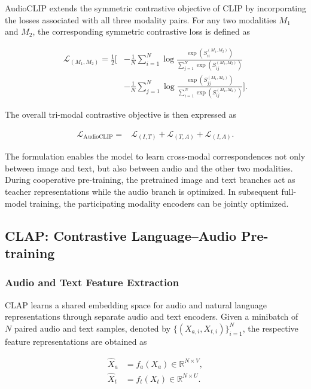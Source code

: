 \documentclass[pdflatex,sn-mathphys-num]{sn-jnl}%
\theoremstyle{thmstyleone}%
\theoremstyle{thmstyletwo}%
\theoremstyle{thmstylethree}%
\begin{document}
AudioCLIP extends the symmetric contrastive objective of CLIP by incorporating the losses associated with all three modality pairs. For any two modalities $M_1$ and $M_2$, the corresponding symmetric contrastive loss is defined as

\begin{align}
\mathcal{L}_{(M_1,M_2)}
=
\frac{1}{2}
\Bigg[
&-\frac{1}{N}
\sum_{i=1}^{N}
\log
\frac{\exp(S_{ii}^{(M_1,M_2)})}
{\sum_{j=1}^{N}\exp(S_{ij}^{(M_1,M_2)})}
\nonumber\\
&-\frac{1}{N}
\sum_{j=1}^{N}
\log
\frac{\exp(S_{jj}^{(M_1,M_2)})}
{\sum_{i=1}^{N}\exp(S_{ij}^{(M_1,M_2)})}
\Bigg].
\label{eq:audioclip_pair_loss}
\end{align}

The overall tri-modal contrastive objective is then expressed as

\begin{equation}
\begin{aligned}
\mathcal{L}_{\mathrm{AudioCLIP}}
={}&
\mathcal{L}_{(I,T)}
+
\mathcal{L}_{(T,A)}
+
\mathcal{L}_{(I,A)}.
\end{aligned}
\label{eq:audioclip_total}
\end{equation}

The formulation enables the model to learn cross-modal correspondences not only between image and text, but also between audio and the other two modalities. During cooperative pre-training, the pretrained image and text branches act as teacher representations while the audio branch is optimized. In subsequent full-model training, the participating modality encoders can be jointly optimized.

\subsection{CLAP: Contrastive Language--Audio Pre-training}

\subsubsection{Audio and Text Feature Extraction}

CLAP learns a shared embedding space for audio and natural language representations through separate audio and text encoders. Given a minibatch of $N$ paired audio and text samples, denoted by $\{(X_{a,i},X_{t,i})\}_{i=1}^{N}$, the respective feature representations are obtained as

\begin{align}
\hat{X}_a &= f_a(X_a)
\in \mathbb{R}^{N \times V}, \\
\hat{X}_t &= f_t(X_t)
\in \mathbb{R}^{N \times U}.
\end{align}
\end{document}
